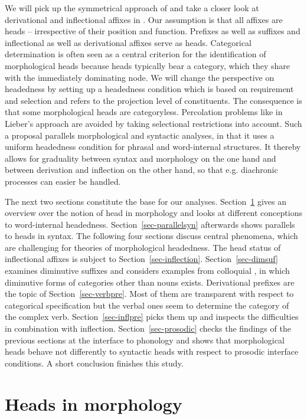 \documentclass[output=paper
  ,nobabel
  ,draftmode
  ,colorlinks, citecolor=brown
]{langscibook}
\begin{document}
We will pick up the symmetrical approach of \citet{Lieber1981} and take a closer look at derivational and inflectional affixes in . Our assumption is that all affixes are heads – irrespective of their position and function. Prefixes as well as suffixes and inflectional as well as derivational affixes serve as heads. Categorical determination is often seen as a central criterion for the identification of morphological heads because heads typically bear a category, which they share with the immediately dominating node. We will change the perspective on headedness by setting up a headedness condition which is based on requirement and selection and refers to the projection level of constituents. The consequence is that some morphological heads are categoryless. Percolation problems like in Lieber's approach are avoided by taking selectional restrictions into account. Such a proposal parallels morphological and syntactic analyses, in that it uses a uniform headedness condition for phrasal and word-internal structures. It thereby allows for graduality between syntax and morphology on the one hand and between derivation and inflection on the other hand, so that e.g. diachronic processes can easier be handled. 

The next two sections constitute the base for our analyses. Section~\ref{sec-headmorph} gives an overview over the notion of head in morphology and looks at different conceptions to word-internal headedness. Section~\ref{sec-parallelsyn} afterwards shows parallels to heads in syntax. The following four sections discuss central phenomena, which are challenging for theories of morphological headedness. The head status of inflectional affixes is subject to Section~\ref{sec-inflection}. Section~\ref{sec-dimsuf} examines diminutive suffixes and considers examples from colloquial , in which diminutive forms of categories other than nouns exists. Derivational prefixes are the topic of Section~\ref{sec-verbpre}. Most of them are transparent with respect to categorical specification but the verbal ones seem to determine the category of the complex verb. Section~\ref{sec-inflpre} picks them up and inspects the difficulties in combination with inflection. Section~\ref{sec-prosodic} checks the findings of the previous sections at the interface to phonology and shows that morphological heads behave not differently to syntactic heads with respect to prosodic interface conditions. A short conclusion finishes this study.

\section{Heads in morphology}\label{sec-headmorph}
\end{document}
